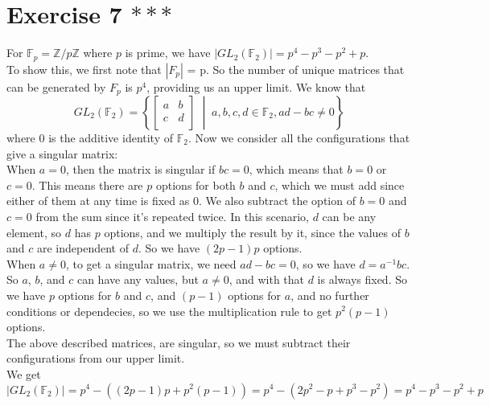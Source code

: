 \documentclass{article}
\newcommand{\Z}{\mathbb{Z}}
\newcommand{\F}{\mathbb{F}}
\begin{document}
    \section*{Exercise 7 $***$}
    For $\F_p = \Z/p\Z$ where $p$ is prime,
    we have $|GL_2(\F_2)| = p^4 - p^3 - p^2 + p$. \\
    To show this, we first note that $|F_p|$ = p. 
    So the number of unique matrices that can be generated by $F_p$
    is $p^4$, providing us an upper limit.
    We know that
    \[ GL_2(\F_2) = \left\{
        \begin{bmatrix}
            a & b \\
            c & d \\
        \end{bmatrix} 
        \; \middle\vert \;
        a, b, c, d \in \F_2,
        ad - bc \neq 0  
    \right\} \] 
    where 0 is the additive identity of $\F_2$.
    Now we consider all the configurations that give a singular matrix: \\
    When $a = 0$,
    then the matrix is singular if $bc = 0$,
    which means that $b = 0$ or $c = 0$.
    This means there are $p$ options for both $b$ and $c$,
    which we must add since either of them at any time is fixed as 0.
    We also subtract the option of $b = 0$ and $c = 0$ from the sum
    since it's repeated twice.
    In this scenario, $d$ can be any element,
    so $d$ has $p$ options,
    and we multiply the result by it,
    since the values of $b$ and $c$ are independent of $d$.
    So we have $(2p - 1)p$ options. \\
    When $a \neq 0$,
    to get a singular matrix, we need $ad - bc = 0$,
    so we have $d = a^{-1}bc$.
    So $a$, $b$, and $c$ can have any values,
    but $a \neq 0$,
    and with that $d$ is always fixed.
    So we have $p$ options for $b$ and $c$,
    and $(p-1)$ options for $a$,
    and no further conditions or dependecies,
    so we use the multiplication rule to get $p^2(p-1)$ options. \\
    The above described matrices, are singular,
    so we must subtract their configurations from our upper limit. \\
    We get $|GL_2(\F_2)| = p^4 - ((2p - 1)p + p^2(p-1))
    = p^4 - (2p^2 - p + p^3 - p^2)
    = p^4 - p^3 - p^2 + p$
\end{document}
